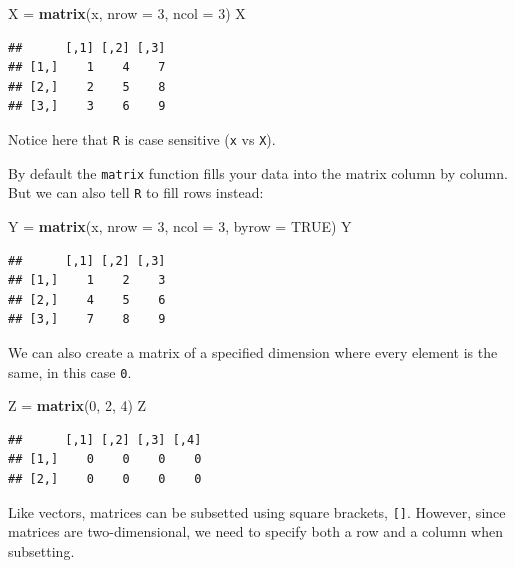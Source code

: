 \documentclass[]{book}
\newenvironment{Shaded}{\begin{snugshade}}{\end{snugshade}}
\newcommand{\KeywordTok}[1]{\textcolor[rgb]{0.13,0.29,0.53}{\textbf{#1}}}
\newcommand{\DataTypeTok}[1]{\textcolor[rgb]{0.13,0.29,0.53}{#1}}
\newcommand{\DecValTok}[1]{\textcolor[rgb]{0.00,0.00,0.81}{#1}}
\newcommand{\StringTok}[1]{\textcolor[rgb]{0.31,0.60,0.02}{#1}}
\newcommand{\OtherTok}[1]{\textcolor[rgb]{0.56,0.35,0.01}{#1}}
\newcommand{\NormalTok}[1]{#1}
\theoremstyle{definition}
\theoremstyle{definition}
\theoremstyle{definition}
\theoremstyle{remark}
\begin{document}
\begin{Shaded}
\begin{Highlighting}[]
\NormalTok{X =}\StringTok{ }\KeywordTok{matrix}\NormalTok{(x, }\DataTypeTok{nrow =} \DecValTok{3}\NormalTok{, }\DataTypeTok{ncol =} \DecValTok{3}\NormalTok{)}
\NormalTok{X}
\end{Highlighting}
\end{Shaded}

\begin{verbatim}
##      [,1] [,2] [,3]
## [1,]    1    4    7
## [2,]    2    5    8
## [3,]    3    6    9
\end{verbatim}

Notice here that \texttt{R} is case sensitive (\texttt{x} vs
\texttt{X}).

By default the \texttt{matrix} function fills your data into the matrix
column by column. But we can also tell \texttt{R} to fill rows instead:

\begin{Shaded}
\begin{Highlighting}[]
\NormalTok{Y =}\StringTok{ }\KeywordTok{matrix}\NormalTok{(x, }\DataTypeTok{nrow =} \DecValTok{3}\NormalTok{, }\DataTypeTok{ncol =} \DecValTok{3}\NormalTok{, }\DataTypeTok{byrow =} \OtherTok{TRUE}\NormalTok{)}
\NormalTok{Y}
\end{Highlighting}
\end{Shaded}

\begin{verbatim}
##      [,1] [,2] [,3]
## [1,]    1    2    3
## [2,]    4    5    6
## [3,]    7    8    9
\end{verbatim}

We can also create a matrix of a specified dimension where every element
is the same, in this case \texttt{0}.

\begin{Shaded}
\begin{Highlighting}[]
\NormalTok{Z =}\StringTok{ }\KeywordTok{matrix}\NormalTok{(}\DecValTok{0}\NormalTok{, }\DecValTok{2}\NormalTok{, }\DecValTok{4}\NormalTok{)}
\NormalTok{Z}
\end{Highlighting}
\end{Shaded}

\begin{verbatim}
##      [,1] [,2] [,3] [,4]
## [1,]    0    0    0    0
## [2,]    0    0    0    0
\end{verbatim}

Like vectors, matrices can be subsetted using square brackets,
\texttt{{[}{]}}. However, since matrices are two-dimensional, we need to
specify both a row and a column when subsetting.
\end{document}
